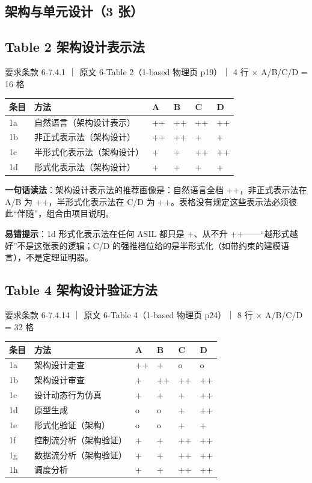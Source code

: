 \subsection{架构与单元设计（3 张）}

\subsection{Table 2 架构设计表示法}

要求条款 6-7.4.1 ｜ 原文 6-Table 2（1-based 物理页 p19）｜ 4 行 \(\times\) A/B/C/D = 16 格

\begin{center}
\begingroup\small
\setlength{\tabcolsep}{4pt}
\begin{tabularx}{\linewidth}{@{}XXXXXX@{}}
\toprule
条目 & 方法 & A & B & C & D \\
\midrule
1a & 自然语言（架构设计表示） & ++ & ++ & ++ & ++ \\
1b & 非正式表示法（架构设计） & ++ & ++ & + & + \\
1c & 半形式化表示法（架构设计） & + & + & ++ & ++ \\
1d & 形式化表示法（架构设计） & + & + & + & + \\
\bottomrule
\end{tabularx}
\endgroup
\end{center}

\textbf{一句话读法}：架构设计表示法的推荐画像是：自然语言全档 ++，非正式表示法在 A/B 为 ++，半形式化表示法在 C/D 为 ++。表格没有规定这些表示法必须彼此“伴随”，组合由项目说明。

\textbf{易错提示}：1d 形式化表示法在任何 ASIL 都只是 +、从不升 ++——“越形式越好”不是这张表的逻辑；C/D 的强推档位给的是半形式化（如带约束的建模语言），不是定理证明器。

\subsection{Table 4 架构设计验证方法}

要求条款 6-7.4.14 ｜ 原文 6-Table 4（1-based 物理页 p24）｜ 8 行 \(\times\) A/B/C/D = 32 格

\begin{center}
\begingroup\small
\setlength{\tabcolsep}{4pt}
\begin{tabularx}{\linewidth}{@{}XXXXXX@{}}
\toprule
条目 & 方法 & A & B & C & D \\
\midrule
1a & 架构设计走查 & ++ & + & o & o \\
1b & 架构设计审查 & + & ++ & ++ & ++ \\
1c & 设计动态行为仿真 & + & + & + & ++ \\
1d & 原型生成 & o & o & + & ++ \\
1e & 形式化验证（架构） & o & o & + & + \\
1f & 控制流分析（架构验证） & + & + & ++ & ++ \\
1g & 数据流分析（架构验证） & + & + & ++ & ++ \\
1h & 调度分析 & + & + & ++ & ++ \\
\bottomrule
\end{tabularx}
\endgroup
\end{center}

